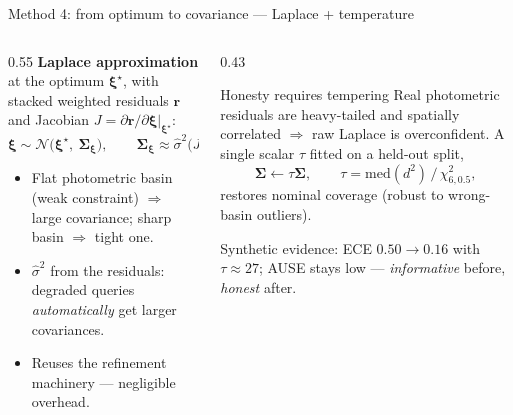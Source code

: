 \documentclass[aspectratio=169,10pt]{beamer}
\newcommand{\bad}[1]{{\color{uHigh}#1}}
\begin{document}
\begin{frame}{Method 4: from optimum to covariance --- Laplace + temperature}
  \begin{columns}[T]
    \begin{column}{0.55\textwidth}
      \textbf{Laplace approximation} at the optimum $\bm\xi^\star$, with
      stacked weighted residuals $\mathbf{r}$ and Jacobian
      $J = \partial\mathbf{r}/\partial\bm\xi|_{\bm\xi^\star}$:
      \begin{equation*}
        \bm\xi \sim \mathcal{N}\big(\bm\xi^\star,\ \bm\Sigma_{\bm\xi}\big),
        \qquad
        \bm\Sigma_{\bm\xi} \approx \hat\sigma^2 \big(J^\top W J\big)^{-1}
      \end{equation*}
      \begin{itemize}
        \item Flat photometric basin (weak constraint) $\Rightarrow$ large
              covariance; sharp basin $\Rightarrow$ tight one.
        \item $\hat\sigma^2$ from the residuals: degraded queries
              \emph{automatically} get larger covariances.
        \item Reuses the refinement machinery --- negligible overhead.
      \end{itemize}
    \end{column}
    \begin{column}{0.43\textwidth}
      \begin{block}{Honesty requires tempering}
        \small Real photometric residuals are heavy-tailed and spatially
        correlated $\Rightarrow$ raw Laplace is \bad{overconfident}. A
        single scalar $\tau$ fitted on a held-out split,
        \begin{equation*}
          \bm\Sigma \leftarrow \tau \bm\Sigma, \qquad
          \tau = \mathrm{med}(d^2)\,/\,\chi^2_{6,0.5},
        \end{equation*}
        restores nominal coverage (robust to wrong-basin outliers).
      \end{block}
      \small Synthetic evidence: ECE $0.50 \!\to\! 0.16$ with
      $\tau \approx 27$; AUSE stays low --- \emph{informative} before,
      \emph{honest} after.
    \end{column}
  \end{columns}
\end{frame}
\end{document}
